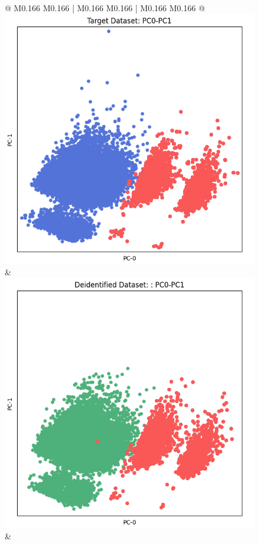 \begin{figure}[p!]
\begin{tabular}{@{} M{0.166\textwidth} M{0.166\textwidth} | M{0.166\textwidth} M{0.166\textwidth} | M{0.166\textwidth} M{0.166\textwidth} @{}}
       \includegraphics[width=\linewidth]{z_Aindo.orig.png} &
       \includegraphics[width=\linewidth]{z_Aindo.syn.png} \\ 
 &

\end{tabular}
\end{figure}
